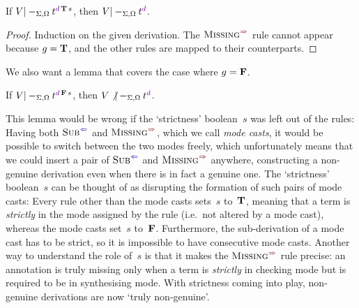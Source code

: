 \begin{lemma}\label{thm:Pre?-true}
If\/ $V |-_{\Sigma,\Omega} t^{\dir{d}\,\True\,s}$, then $V |-_{\Sigma,\Omega} t^\dir{d}$.
\end{lemma}

\begin{proof}
Induction on the given derivation.
The $\SynRule{Missing}$ rule cannot appear because $g = \mathbf{T}$, and the other rules are mapped to their counterparts.
\end{proof}

We also want a lemma that covers the case where $g = \mathbf{F}$.

\begin{lemma}\label{thm:Pre?-false}
If\/ $V |-_{\Sigma,\Omega} t^{\dir{d}\,\False\,s}$, then $V \not|-_{\Sigma,\Omega} t^\dir{d}$.
\end{lemma}

This lemma would be wrong if the `strictness' boolean~$s$ was left out of the rules:
Having both $\ChkRule{Sub}$ and $\SynRule{Missing}$, which we call \emph{mode casts}, it would be possible to switch between the two modes freely, which unfortunately means that we could insert a pair of $\ChkRule{Sub}$ and $\SynRule{Missing}$ anywhere, constructing a non-genuine derivation even when there is in fact a genuine one.
The `strictness' boolean~$s$ can be thought of as disrupting the formation of such pairs of mode casts:
Every rule other than the mode casts sets~$s$ to~$\mathbf{T}$, meaning that a term is \emph{strictly} in the mode assigned by the rule (i.e.~not altered by a mode cast), whereas the mode casts set~$s$ to~$\mathbf{F}$.
Furthermore, the sub-derivation of a mode cast has to be strict, so it is impossible to have consecutive mode casts.
Another way to understand the role of~$s$ is that it makes the $\SynRule{Missing}$ rule precise: an annotation is truly missing only when a term is \emph{strictly} in checking mode but is required to be in synthesising mode.
With strictness coming into play, non-genuine derivations are now `truly non-genuine'.

